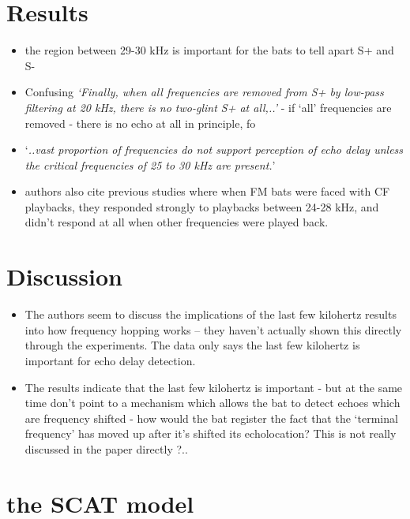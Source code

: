 \documentclass[
]{book}
\providecommand{\tightlist}{%
  \setlength{\itemsep}{0pt}\setlength{\parskip}{0pt}}
\begin{document}
\hypertarget{results}{%
\section{Results}\label{results}}

\begin{itemize}
\tightlist
\item
  the region between 29-30 kHz is important for the bats to tell apart S+ and S-
\item
  Confusing \emph{`Finally, when all frequencies are removed from S+ by low-pass filtering at 20 kHz, there is no two-glint S+ at all,..'} - if `all' frequencies are removed - there is no echo at all in principle, fo
\item
  `\emph{..vast proportion of frequencies do not support perception of echo delay unless the critical frequencies of 25 to 30 kHz are present.}'
\item
  authors also cite previous studies where when FM bats were faced with CF playbacks, they responded strongly to playbacks between 24-28 kHz, and didn't respond at all when other frequencies were played back.
\end{itemize}

\hypertarget{discussion}{%
\section{Discussion}\label{discussion}}

\begin{itemize}
\tightlist
\item
  The authors seem to discuss the implications of the last few kilohertz results into how frequency hopping works -- they haven't actually shown this directly through the experiments. The data only says the last few kilohertz is important for echo delay detection.
\item
  The results indicate that the last few kilohertz is important - but at the same time don't point to a mechanism which allows the bat to detect echoes which are frequency shifted - how would the bat register the fact that the `terminal frequency' has moved up after it's shifted its echolocation? This is not really discussed in the paper directly ?..
\end{itemize}

\hypertarget{the-scat-model}{%
\section{the SCAT model}\label{the-scat-model}}
\end{document}
